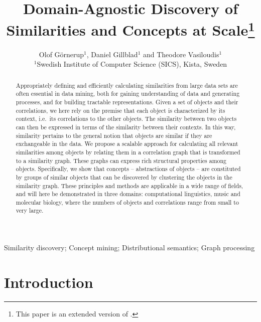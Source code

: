 \documentclass{kais}
\begin{document}
\label{firstpage}

\title{Domain-Agnostic Discovery of Similarities and Concepts at Scale\footnote{This paper is an extended version of \cite{Gornerup2015}.}}

\author[O. G\"{o}rnerup et al]{Olof G\"{o}rnerup$^1$, Daniel Gillblad$^1$ and Theodore Vasiloudis$^1$\\ 
$^1$Swedish Institute of Computer Science (SICS), Kista, Sweden}

\maketitle

\begin{abstract}
Appropriately defining and efficiently calculating similarities from large data sets are often essential
in data mining, both for gaining understanding of data and generating processes, and for building tractable 
representations. Given a set of objects and their correlations, we here rely on the premise that each object 
is characterized by its context, i.e.\ its correlations to the other objects. The similarity between two objects 
can then be expressed in terms of the similarity between their contexts. In this way, similarity pertains to the 
general notion that objects are similar if they are exchangeable in the data. We 
propose a scalable approach for calculating all relevant similarities among objects by relating them 
in a correlation graph that is transformed to a similarity graph. These graphs can express rich structural 
properties among objects. Specifically, we show that concepts -- abstractions of objects -- 
are constituted by groups of similar objects that can be discovered by clustering the objects in the
similarity graph. These principles and methods are 
applicable in a wide range of fields, and will here be demonstrated in three domains: computational linguistics, 
music and molecular biology, where the numbers of objects and correlations range from small to very large.
\end{abstract}

\begin{keywords}
Similarity discovery; Concept mining; Distributional semantics; Graph processing
\end{keywords}

\section{Introduction}
\label{sec:introduction}
\end{document}
